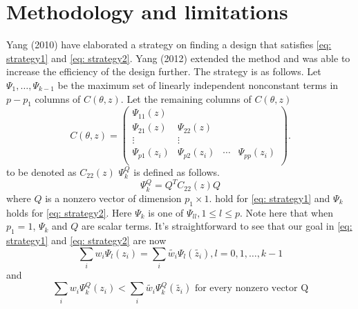 \documentclass[11pt]{amsart}
\theoremstyle{definition}
\theoremstyle{remark}
\begin{document}
\section{Methodology and limitations} 

Yang (2010) have elaborated a strategy on finding a design that satisfies \eqref{eq: strategy1} and \eqref{eq: strategy2}. Yang (2012) extended the method and was able to increase the efficiency of the design further. The strategy is as follows. Let $\Psi_1,\ldots, \Psi_{k-1}$ be the maximum set of linearly independent nonconstant terms in $p-p_1$ columns of $C(\theta,z)$. Let the remaining columns of $C(\theta,z)$ \[C(\theta,z) = \left ( \begin{array}{cccc}
\Psi_{11}(z) &&&\\
\Psi_{21}(z) &\Psi_{22}(z)&&\\
\vdots & \vdots &&\\
\Psi_{p1}(z_i) &\Psi_{p2}(z_i)&\cdots&\Psi_{pp}(z_i)\\
\end{array}\right).\]to be denoted as $C_{22}(z)$ $\Psi_k^Q$ is defined as follows. 
\[\Psi_k^Q = Q^TC_{22}(z)Q\] where $Q$ is a nonzero vector of dimension $p_1\times 1$. 
hold for \eqref{eq: strategy1} and $\Psi_{k}$ holds for  \eqref{eq: strategy2}.  Here $\Psi_k$ is one of  $\Psi_{ll}, 1\le l \le p$. Note here that when $p_1=1$, $\Psi_k$ and $Q$ are scalar terms. It's straightforward to see that our goal in \eqref{eq: strategy1} and \eqref{eq: strategy2} are now 
\begin{equation} \label{eq: st1}
\sum_{i}w_i\Psi_l(z_i)=\sum_{i}\tilde{w_i}\Psi_l(\tilde{z_i}), l=0,1,\ldots, k-1
\end{equation} and \begin{equation} \label{eq: st2}
\sum_{i}w_i\Psi_k^Q(z_i)<\sum_{i}\tilde{w_i}\Psi_k^Q(\tilde{z_i}) \text{  for every nonzero vector Q}
\end{equation} 
\end{document}
